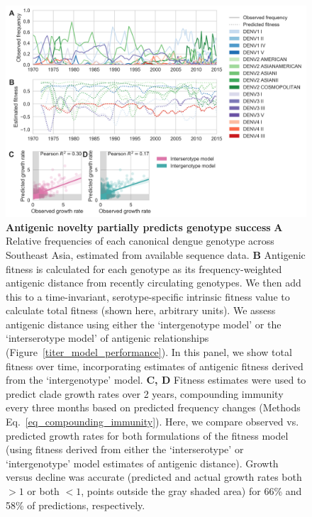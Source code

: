 \documentclass[11pt,oneside,letterpaper]{article}
\begin{document}
\begin{figure}[ht]
  \begin{centering}
\includegraphics[width=\linewidth]{../figures/png/genotype-fitness.png}
    \caption{\textbf{Antigenic novelty partially predicts genotype success }
    \textbf{A} Relative frequencies of each canonical dengue genotype across Southeast Asia, estimated from available sequence data.
    \textbf{B} Antigenic fitness is calculated for each genotype as its frequency-weighted antigenic distance from recently circulating genotypes.
    We then add this to a time-invariant, serotype-specific intrinsic fitness value to calculate total fitness (shown here, arbitrary units).
    We assess antigenic distance using either the `intergenotype model' or the `interserotype model' of antigenic relationships (Figure~\ref{titer_model_performance}).
    In this panel, we show total fitness over time, incorporating estimates of antigenic fitness derived from the `intergenotype' model.
    \textbf{C, D}  Fitness estimates were used to predict clade growth rates over 2 years, compounding immunity every three months based on predicted frequency changes (Methods Eq.~\ref{eq_compounding_immunity}).
    Here, we compare observed vs. predicted growth rates for both formulations of the fitness model (using fitness derived from either the `interserotype' or `intergenotype' model estimates of antigenic distance).
    Growth versus decline was accurate (predicted and actual growth rates both $> 1$ or both $< 1$, points outside the gray shaded area) for 66\% and 58\% of predictions, respectively.
}
     \label{genotype_fitness}
   \end{centering}
\end{figure}
\end{document}

